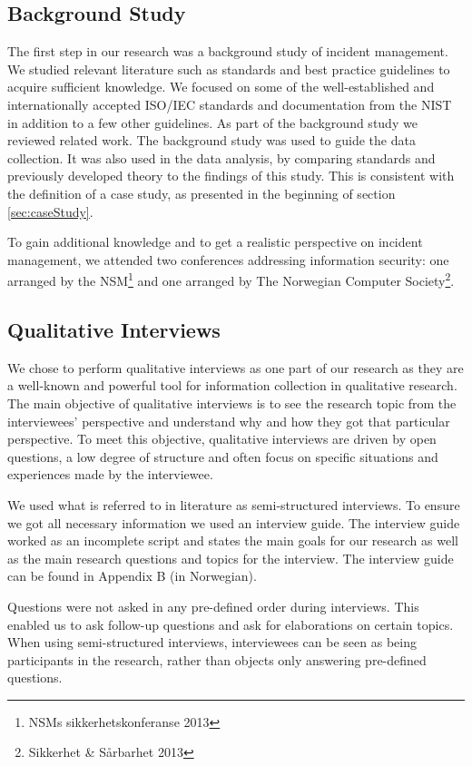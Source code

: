 \subsection{Background Study}
\label{sec:background}
The first step in our research was a background study of incident management. We studied relevant literature such as standards and best practice guidelines to acquire sufficient knowledge. We focused on some of the well-established and internationally accepted ISO/IEC standards and documentation from the \ac{NIST} in addition to a few other guidelines. As part of the background study we reviewed related work. The background study was used to guide the data collection. It was also used in the data analysis, by comparing standards and previously developed theory to the findings of this study. This is consistent with the definition of a case study, as presented in the beginning of section \ref{sec:caseStudy}.

To gain additional knowledge and to get a realistic perspective on incident management, we attended two conferences addressing information security: one arranged by the \ac{NSM}\footnote{NSMs sikkerhetskonferanse 2013} and one arranged by The Norwegian Computer Society\footnote{Sikkerhet \& S\aa rbarhet 2013}.

\subsection{Qualitative Interviews}
\label{sec:interviews}
We chose to perform qualitative interviews as one part of our research as they are a well-known and powerful tool for information collection in qualitative research\cite{myers2007qualitative}. The main objective of qualitative interviews is to see the research topic from the interviewees' perspective and understand why and how they got that particular perspective\cite{cassell2004essential}. To meet this objective, qualitative interviews are driven by open questions, a low degree of structure and often focus on specific situations and experiences made by the interviewee. 

We used what is referred to in literature as semi-structured interviews\cite{cassell2004essential}. To ensure we got all necessary information we used an interview guide. The interview guide worked as an incomplete script and states the main goals for our research as well as the main research questions and topics for the interview. The interview guide can be found in Appendix B (in Norwegian).

Questions were not asked in any pre-defined order during interviews. This enabled us to ask follow-up questions and ask for elaborations on certain topics. When using semi-structured interviews, interviewees can be seen as being participants in the research, rather than objects only answering pre-defined questions.

